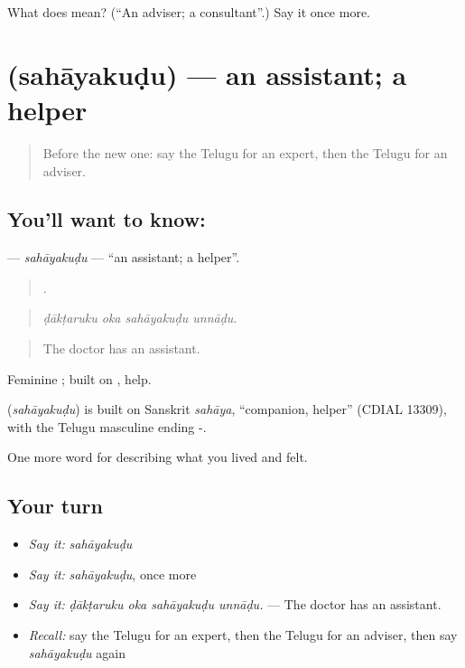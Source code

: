 \begin{tcolorbox}[breakable,colback=teal!4,colframe=teal!35!black,title={Before you move on}]
What does  mean? (\textquotedblleft{}An adviser; a consultant\textquotedblright{}.) Say it once more.
\end{tcolorbox}
\section[\texorpdfstring{\te{సహాయకుడు} (sahāyakuḍu)}{సహాయకుడు (sahāyakuḍu)}]{ (sahāyakuḍu) — an assistant; a helper}

\label{lesson:TE-C523-sahayakudu}



\begin{quote}
Before the new one: say the Telugu for an expert, then the Telugu for an adviser.
\end{quote}

\subsection*{You'll want to know: }
\textbf{} — \emph{sahāyakuḍu} — \textquotedblleft{}an assistant; a helper\textquotedblright{}.

\begin{quote}
   .
\end{quote}

\begin{quote}
\emph{ḍākṭaruku oka sahāyakuḍu unnāḍu.}
\end{quote}

\begin{quote}
The doctor has an assistant.
\end{quote}

Feminine ; built on , help.

\begin{cousinweb}
\textbf{} (\emph{sahāyakuḍu}) is built on Sanskrit \emph{sahāya}, \textquotedblleft{}companion, helper\textquotedblright{} (CDIAL 13309), with the Telugu masculine ending -.
\end{cousinweb}

\begin{grammarlens}[title={What you've built}]
One more word for describing what you lived and felt.
\end{grammarlens}

\subsection*{Your turn}
\begin{itemize}
\raggedright
  \item \emph{Say it:} \emph{sahāyakuḍu}
  \item \emph{Say it:} \emph{sahāyakuḍu}, once more
  \item \emph{Say it:} \emph{ḍākṭaruku oka sahāyakuḍu unnāḍu.} — The doctor has an assistant.
  \item \emph{Recall:} say the Telugu for an expert, then the Telugu for an adviser, then say \emph{sahāyakuḍu} again
\end{itemize}

